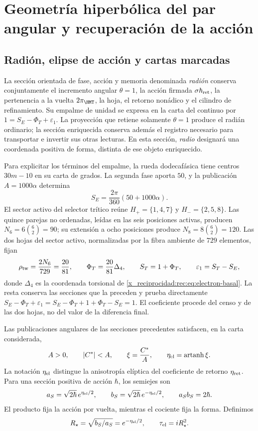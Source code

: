 \chapter{Geometría hiperbólica del par angular y recuperación de la acción}
\label{x_reciprocidad:rec:radial}

\section{Radión, elipse de acción y cartas marcadas}

La sección orientada de fase, acción y memoria denominada \emph{radión} conserva conjuntamente el incremento angular \(\theta=1\), la acción firmada \(\sigma\hbar_{\rm ret}\), la pertenencia a la vuelta \(2\pi_{\HMT}\), la hoja, el retorno nonádico y el cilindro de refinamiento. Su empalme de unidad se expresa en la carta del continuo por \(1=S_E-\Phi_T+\varepsilon_1\). La proyección que retiene solamente \(\theta=1\) produce el radián ordinario; la sección enriquecida conserva además el registro necesario para transportar e invertir sus otras lecturas. En esta sección, \emph{radio} designará una coordenada positiva de forma, distinta de ese objeto enriquecido.

Para explicitar los términos del empalme, la rueda dodecafásica tiene centros \(30m-10\) en su carta de grados. La segunda fase aporta \(50\), y la publicación \(A=1000\alpha\) determina
\[
 S_E=\frac{2\pi}{360}(50+1000\alpha).
\]
El sector activo del selector trítico reúne \(H_+=\{1,4,7\}\) y \(H_-=\{2,5,8\}\). Las quince parejas no ordenadas, leídas en las seis posiciones activas, producen \(N_6=6\binom62=90\); su extensión a ocho posiciones produce \(N_8=8\binom62=120\). Las dos hojas del sector activo, normalizadas por la fibra ambiente de \(729\) elementos, fijan
\[
 \rho_{\rm tw}=\frac{2N_6}{729}=\frac{20}{81},\qquad
 \Phi_T=\frac{20}{81}\Delta_4,\qquad
 S_T=1+\Phi_T,\qquad \varepsilon_1=S_T-S_E,
\]
donde \(\Delta_4\) es la coordenada torsional de \eqref{x_reciprocidad:rec:eq:electron-basal}. La resta conserva las secciones que la preceden y prueba directamente
\(S_E-\Phi_T+\varepsilon_1=S_E-\Phi_T+1+\Phi_T-S_E=1\).
El coeficiente procede del censo y de las dos hojas, no del valor de la diferencia final.

Las publicaciones angulares de las secciones precedentes satisfacen, en la carta considerada,
\[
 A>0,\qquad |C^*|<A,\qquad
 \xi=\frac{C^*}{A},\qquad \eta_{\rm el}=\operatorname{artanh}\xi.
\]
La notación \(\eta_{\rm el}\) distingue la anisotropía elíptica del coeficiente de retorno \(\eta_{\rm ret}\). Para una sección positiva de acción \(\hbar\), los semiejes son
\begin{equation}
 a_S=\sqrt{2\hbar}\,e^{\eta_{\rm el}/2},\qquad
 b_S=\sqrt{2\hbar}\,e^{-\eta_{\rm el}/2},\qquad a_Sb_S=2\hbar.
 \label{x_reciprocidad:rec:eq:elipse}
\end{equation}
El producto fija la acción por vuelta, mientras el cociente fija la forma. Definimos
\[
 R_\star=\sqrt{b_S/a_S}=e^{-\eta_{\rm el}/2},\qquad
 \tau_{\rm el}=iR_\star^2.
\]

